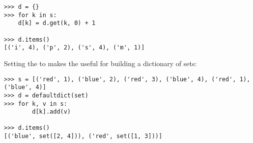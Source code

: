 \begin{verbatim}
>>> d = {}
>>> for k in s:
	d[k] = d.get(k, 0) + 1

>>> d.items()
[('i', 4), ('p', 2), ('s', 4), ('m', 1)]
\end{verbatim}

Setting the  to  makes the
 useful for building a dictionary of sets:

\begin{verbatim}
>>> s = [('red', 1), ('blue', 2), ('red', 3), ('blue', 4), ('red', 1), ('blue', 4)]
>>> d = defaultdict(set)
>>> for k, v in s:
        d[k].add(v)

>>> d.items()
[('blue', set([2, 4])), ('red', set([1, 3]))]
\end{verbatim}
